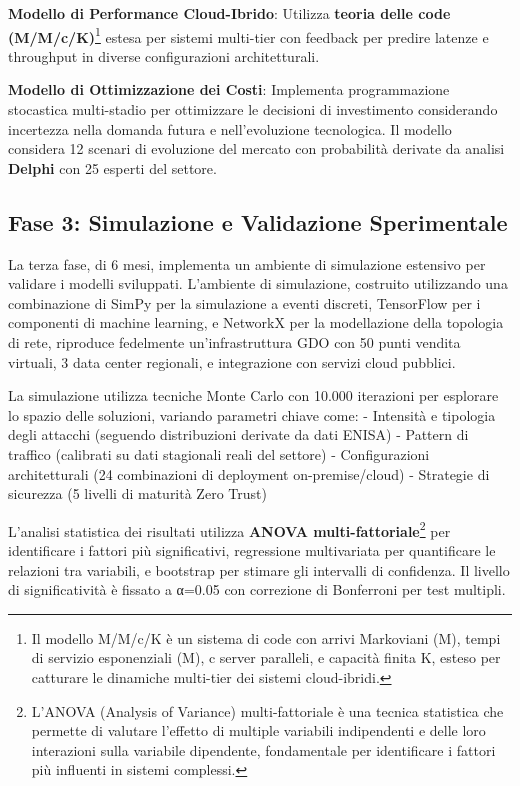 \textbf{Modello di Performance Cloud-Ibrido}: Utilizza \textbf{teoria delle code (M/M/c/K)}\footnote{Il modello M/M/c/K è un sistema di code con arrivi Markoviani (M), tempi di servizio esponenziali (M), c server paralleli, e capacità finita K, esteso per catturare le dinamiche multi-tier dei sistemi cloud-ibridi.} estesa per sistemi multi-tier con feedback per predire latenze e throughput in diverse configurazioni architetturali. 

\textbf{Modello di Ottimizzazione dei Costi}: Implementa programmazione stocastica multi-stadio per ottimizzare le decisioni di investimento considerando incertezza nella domanda futura e nell'evoluzione tecnologica. Il modello considera 12 scenari di evoluzione del mercato con probabilità derivate da analisi \textbf{Delphi} con 25 esperti del settore.

\subsection{Fase 3: Simulazione e Validazione Sperimentale}

La terza fase, di 6 mesi, implementa un ambiente di simulazione estensivo per validare i modelli sviluppati. L'ambiente di simulazione, costruito utilizzando una combinazione di SimPy per la simulazione a eventi discreti, TensorFlow per i componenti di machine learning, e NetworkX per la modellazione della topologia di rete, riproduce fedelmente un'infrastruttura GDO con 50 punti vendita virtuali, 3 data center regionali, e integrazione con servizi cloud pubblici.

La simulazione utilizza tecniche Monte Carlo con 10.000 iterazioni per esplorare lo spazio delle soluzioni, variando parametri chiave come:
- Intensità e tipologia degli attacchi (seguendo distribuzioni derivate da dati ENISA)
- Pattern di traffico (calibrati su dati stagionali reali del settore)
- Configurazioni architetturali (24 combinazioni di deployment on-premise/cloud)
- Strategie di sicurezza (5 livelli di maturità Zero Trust)

L'analisi statistica dei risultati utilizza \textbf{ANOVA multi-fattoriale}\footnote{L'ANOVA (Analysis of Variance) multi-fattoriale è una tecnica statistica che permette di valutare l'effetto di multiple variabili indipendenti e delle loro interazioni sulla variabile dipendente, fondamentale per identificare i fattori più influenti in sistemi complessi.} per identificare i fattori più significativi, regressione multivariata per quantificare le relazioni tra variabili, e bootstrap per stimare gli intervalli di confidenza. Il livello di significatività è fissato a α=0.05 con correzione di Bonferroni per test multipli.

